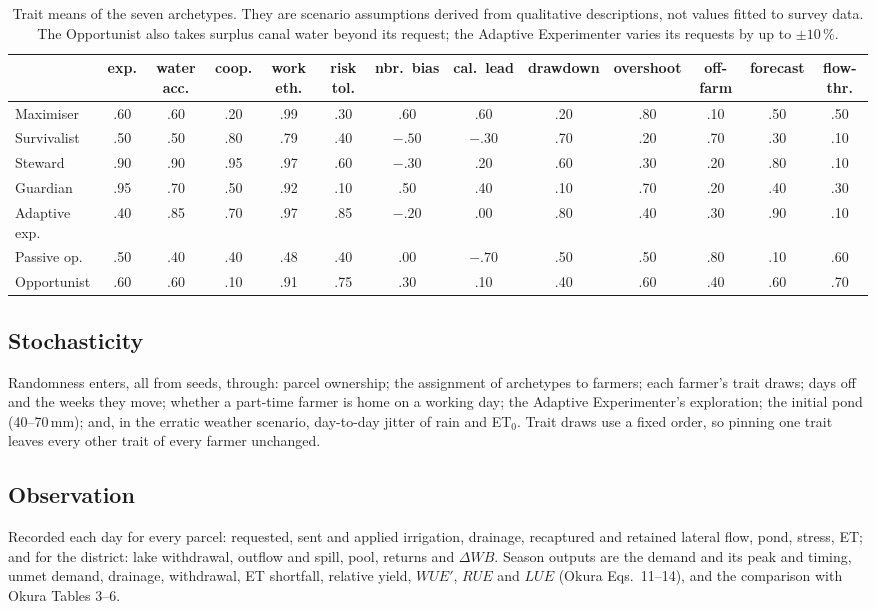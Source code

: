 \documentclass[11pt]{article}
\begin{document}
\begin{table}[H]
\centering\scriptsize
\setlength{\tabcolsep}{3.2pt}
\begin{tabular}{lcccccccccccc}
\toprule
 & exp. & water acc. & coop. & work eth. & risk tol. & nbr.\ bias & cal.\ lead & drawdown & overshoot & off-farm & forecast & flow-thr. \\ \midrule
Maximiser & .60 & .60 & .20 & .99 & .30 & .60 & .60 & .20 & .80 & .10 & .50 & .50 \\
Survivalist & .50 & .50 & .80 & .79 & .40 & $-.50$ & $-.30$ & .70 & .20 & .70 & .30 & .10 \\
Steward & .90 & .90 & .95 & .97 & .60 & $-.30$ & .20 & .60 & .30 & .20 & .80 & .10 \\
Guardian & .95 & .70 & .50 & .92 & .10 & .50 & .40 & .10 & .70 & .20 & .40 & .30 \\
Adaptive exp. & .40 & .85 & .70 & .97 & .85 & $-.20$ & .00 & .80 & .40 & .30 & .90 & .10 \\
Passive op. & .50 & .40 & .40 & .48 & .40 & .00 & $-.70$ & .50 & .50 & .80 & .10 & .60 \\
Opportunist & .60 & .60 & .10 & .91 & .75 & .30 & .10 & .40 & .60 & .40 & .60 & .70 \\
\bottomrule
\end{tabular}
\caption{Trait means of the seven archetypes. They are scenario assumptions derived from qualitative descriptions, not values fitted to survey data. The Opportunist also takes surplus canal water beyond its request; the Adaptive Experimenter varies its requests by up to $\pm10\,\%$.}
\label{tab:archetypes}
\end{table}

\subsection{Stochasticity}
Randomness enters, all from seeds, through: parcel ownership; the assignment of archetypes to farmers; each farmer's trait draws; days off and the weeks they move; whether a part-time farmer is home on a working day; the Adaptive Experimenter's exploration; the initial pond (40--70\,mm); and, in the erratic weather scenario, day-to-day jitter of rain and ET$_0$. Trait draws use a fixed order, so pinning one trait leaves every other trait of every farmer unchanged.

\subsection{Observation}
Recorded each day for every parcel: requested, sent and applied irrigation, drainage, recaptured and retained lateral flow, pond, stress, ET; and for the district: lake withdrawal, outflow and spill, pool, returns and $\Delta WB$. Season outputs are the demand and its peak and timing, unmet demand, drainage, withdrawal, ET shortfall, relative yield, $WUE'$, $RUE$ and $LUE$ (Okura Eqs.~11--14), and the comparison with Okura Tables 3--6.
\end{document}
